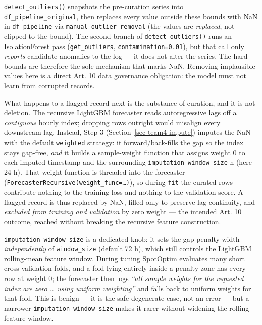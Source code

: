 \documentclass[
  english,
  letterpaper,
]{scrbook}
\begin{document}
\texttt{detect\_outliers()} snapshots the pre-curation series into
\texttt{df\_pipeline\_original}, then replaces every value outside these
bounds with NaN in \texttt{df\_pipeline} via
\texttt{manual\_outlier\_removal} (the values are \emph{replaced}, not
clipped to the bound). The second branch of \texttt{detect\_outliers()}
runs an IsolationForest pass (\texttt{get\_outliers},
\texttt{contamination=0.01}), but that call only \emph{reports}
candidate anomalies to the log --- it does not alter the series. The
hard bounds are therefore the sole mechanism that marks NaN. Removing
implausible values here is a direct Art. 10 data governance obligation:
the model must not learn from corrupted records.

What happens to a flagged record next is the substance of curation, and
it is not deletion. The recursive LightGBM forecaster reads
autoregressive lags off a \emph{contiguous} hourly index; dropping rows
outright would misalign every downstream lag. Instead, Step 3
(Section~\ref{sec-team4-impute}) imputes the NaN with the default
\texttt{weighted} strategy: it forward/back-fills the gap so the index
stays gap-free, \emph{and} it builds a sample-weight function that
assigns weight 0 to each imputed timestamp and the surrounding
\texttt{imputation\_window\_size} h (here 24 h). That weight function is
threaded into the forecaster
(\texttt{ForecasterRecursive(weight\_func=…)}), so during \texttt{fit}
the curated rows contribute nothing to the training loss and nothing to
the validation score. A flagged record is thus replaced by NaN, filled
only to preserve lag continuity, and \emph{excluded from training and
validation} by zero weight --- the intended Art. 10 outcome, reached
without breaking the recursive feature construction.

\texttt{imputation\_window\_size} is a dedicated knob: it sets the
gap-penalty width \emph{independently} of \texttt{window\_size} (default
72 h), which still controls the LightGBM rolling-mean feature window.
During tuning SpotOptim evaluates many short cross-validation folds, and
a fold lying entirely inside a penalty zone has every row at weight 0;
the forecaster then logs \emph{``all sample weights for the requested
index are zero \ldots{} using uniform weighting''} and falls back to
uniform weights for that fold. This is benign --- it is the safe
degenerate case, not an error --- but a narrower
\texttt{imputation\_window\_size} makes it rarer without widening the
rolling-feature window.
\end{document}
